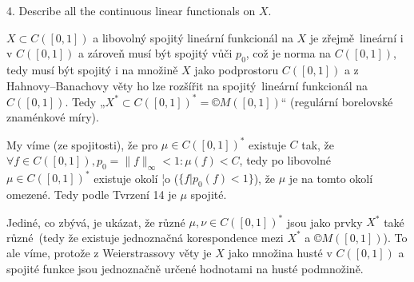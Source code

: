 \documentclass[12pt]{article}					%
\begin{document}
\begin{priklad}[11]
	4. Describe all the continuous linear functionals on $X$.

	\begin{reseni}
		$X \subset C([0, 1])$ a libovolný spojitý lineární funkcionál na $X$ je zřejmě lineární i v $C([0, 1])$ a zároveň musí být spojitý vůči $p_0$, což je norma na $C([0, 1])$, tedy musí být spojitý i na množině $X$ jako podprostoru $C([0, 1])$ a z Hahnovy–Banachovy věty ho lze rozšířit na spojitý lineární funkcionál na $C([0, 1])$. Tedy „$X^* \subset C([0, 1])^* = ©M([0, 1])$“ (regulární borelovské znaménkové míry).

		My víme (ze spojitosti), že pro $μ \in C([0, 1])^*$ existuje $C$ tak, že $\forall f \in C([0, 1]), p_0 = \|f\|_∞ < 1: μ(f) < C$, tedy po libovolné $μ \in C([0, 1])^*$ existuje okolí ¦o ($\{f | p_0(f) < 1\}$), že $μ$ je na tomto okolí omezené. Tedy podle Tvrzení 14 je $μ$ spojité.

		Jediné, co zbývá, je ukázat, že různé $μ, ν \in C([0, 1])^*$ jsou jako prvky $X^*$ také různé (tedy že existuje jednoznačná korespondence mezi $X^*$ a $©M([0, 1])$). To ale víme, protože z Weierstrassovy věty je $X$ jako množina husté v $C([0, 1])$ a spojité funkce jsou jednoznačně určené hodnotami na husté podmnožině.
	\end{reseni}
\end{priklad}
\end{document}
